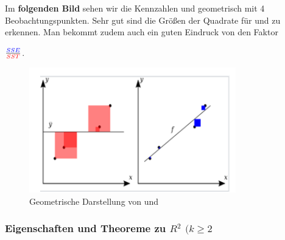 \documentclass[12pt]{article}
\begin{document}
% 
% 
Im \textbf{folgenden Bild} sehen wir die Kennzahlen {\color{blue}{SSE}} und {\color{red}{SST}} geometrisch mit 4 Beobachtungspunkten. Sehr gut sind die Größen der Quadrate für {\color{blue}{SSE}} und {\color{red}{SST}} zu erkennen. Man bekommt zudem auch ein guten Eindruck von den Faktor 
\begin{large}
$ \frac{\color{blue}{SSE}}{\color{red}{SST}} $.\\[8.8cm]
\end{large}
%
\begin{figure}[htp]
\hspace*{-0.2cm}  
\centering 
\includegraphics[width=0.8\textwidth]{SSE_SST-Definition}
  \caption{Geometrische Darstellung von {\color{blue}{SSE}} und {\color{red}{SST}}}
  \label{fig:SSE-SST-1}
\end{figure}
%
\subsubsection{Eigenschaften und Theoreme zu $R^2$ $(k \geqslant 2$ } 
\end{document}
